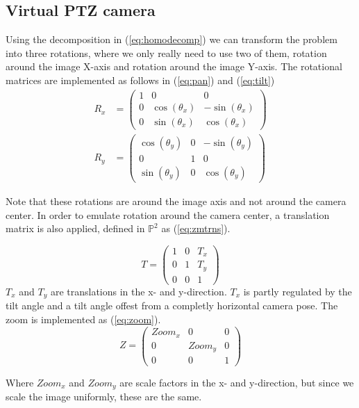\subsection{Virtual PTZ camera}
Using the decomposition in (\ref{eq:homodecomp}) we can transform the problem into three rotations, where we only really need to use two of them, rotation around the image X-axis and rotation around the image Y-axis. The rotational matrices are implemented as follows in (\ref{eq:pan}) and (\ref{eq:tilt})
	\begin{align}
		R_x &=\begin{pmatrix}1 & 0 & 0 \\
			0 & \cos(\theta_x) & -\sin(\theta_x) \\
			0 & \sin(\theta_x) & \cos(\theta_x)
		\end{pmatrix} \label{eq:pan}\\
		R_y&=\begin{pmatrix} \cos(\theta_y) & 0 & -\sin(\theta_y) \\
			0 & 1 & 0 \\
			\sin(\theta_y) & 0 & \cos(\theta_y)
		\end{pmatrix} \label{eq:tilt}
	\end{align}

	Note that these rotations are around the image axis and not around the camera center. In order to emulate rotation around the camera center, a translation matrix is also applied, defined in $\mathbb{P}^2$ as (\ref{eq:zmtrns}).

	\begin{equation}
		T=\begin{pmatrix}
			1 & 0 & T_x \\
			0 & 1 & T_y \\
			0 & 0 & 1
		\end{pmatrix} \label{eq:zmtrns}
	\end{equation}
	$T_x$ and $T_y$ are translations in the x- and y-direction. $T_x$ is partly regulated by the tilt angle and a tilt angle offest from a completly horizontal camera pose.
	The zoom is implemented as (\ref{eq:zoom}).
	\begin{equation}
		Z=\begin{pmatrix}
			Zoom_x & 0 & 0\\
			0 & Zoom_y & 0\\
			0 & 0 & 1
		\end{pmatrix}
		\label{eq:zoom}
	\end{equation}

	Where $Zoom_x$ and $Zoom_y$ are scale factors in the x- and y-direction, but since we scale the image uniformly, these are the same.

